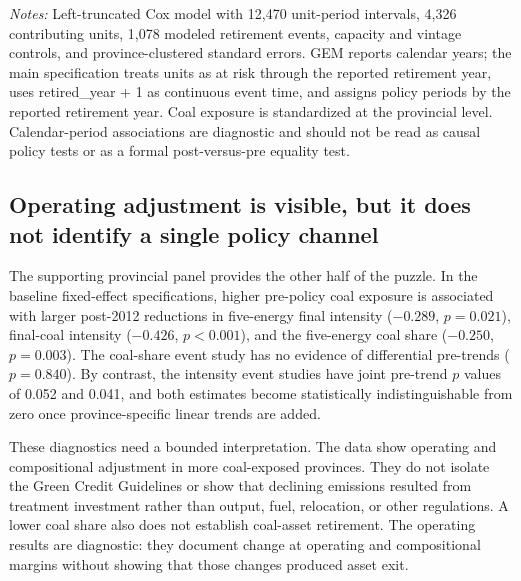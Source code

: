 \documentclass[11pt]{article}
\newcommand{\note}[1]{\begin{minipage}{0.96\textwidth}\footnotesize\textit{Notes:} #1\end{minipage}}
\begin{document}
\begin{table}[H]
\centering
\caption{Coal-unit retirement hazard by calendar period and pre-policy coal exposure}
\label{tab:cox}
\note{Left-truncated Cox model with 12,470 unit-period intervals, 4,326 contributing units, 1,078 modeled retirement events, capacity and vintage controls, and province-clustered standard errors. GEM reports calendar years; the main specification treats units as at risk through the reported retirement year, uses retired\_year + 1 as continuous event time, and assigns policy periods by the reported retirement year. Coal exposure is standardized at the provincial level. Calendar-period associations are diagnostic and should not be read as causal policy tests or as a formal post-versus-pre equality test.}
\end{table}

\subsection{Operating adjustment is visible, but it does not identify a single policy channel}

The supporting provincial panel provides the other half of the puzzle. In the baseline fixed-effect specifications, higher pre-policy coal exposure is associated with larger post-2012 reductions in five-energy final intensity ($-0.289$, $p=0.021$), final-coal intensity ($-0.426$, $p<0.001$), and the five-energy coal share ($-0.250$, $p=0.003$). The coal-share event study has no evidence of differential pre-trends ($p=0.840$). By contrast, the intensity event studies have joint pre-trend $p$ values of 0.052 and 0.041, and both estimates become statistically indistinguishable from zero once province-specific linear trends are added.

These diagnostics need a bounded interpretation. The data show operating and compositional adjustment in more coal-exposed provinces. They do not isolate the Green Credit Guidelines or show that declining emissions resulted from treatment investment rather than output, fuel, relocation, or other regulations. A lower coal share also does not establish coal-asset retirement. The operating results are diagnostic: they document change at operating and compositional margins without showing that those changes produced asset exit.
\end{document}
